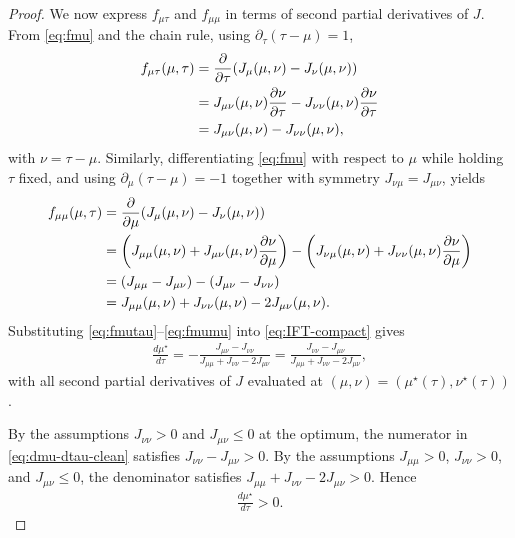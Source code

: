 \documentclass[twoside]{article}
\begin{document}
\begin{proof}
We now express $f_{\mu\tau}$ and $f_{\mu\mu}$ in terms of second partial derivatives of $J$. From \eqref{eq:fmu} and the chain rule, using $\partial_\tau(\tau - \mu) = 1$,
\begin{align}
    f_{\mu\tau}(\mu, \tau)
    &= \frac{\partial}{\partial\tau} \qty( J_\mu(\mu, \nu) - J_\nu(\mu, \nu) ) \nonumber\\
    &= J_{\mu\nu}(\mu, \nu) \frac{\partial\nu}{\partial\tau}
       - J_{\nu\nu}(\mu, \nu) \frac{\partial\nu}{\partial\tau} \nonumber\\
    &= J_{\mu\nu}(\mu, \nu) - J_{\nu\nu}(\mu, \nu),
    \label{eq:fmutau}
\end{align}
with $\nu = \tau - \mu$. Similarly, differentiating \eqref{eq:fmu} with respect to $\mu$ while holding $\tau$ fixed, and using $\partial_\mu(\tau - \mu) = -1$ together with symmetry $J_{\nu\mu} = J_{\mu\nu}$, yields
\begin{align}
    f_{\mu\mu}(\mu, \tau)
    &= \frac{\partial}{\partial\mu} \qty( J_\mu(\mu, \nu) - J_\nu(\mu, \nu) ) \nonumber\\
    &= \qty( J_{\mu\mu}(\mu, \nu) + J_{\mu\nu}(\mu, \nu) \frac{\partial\nu}{\partial\mu} )
       - \qty( J_{\nu\mu}(\mu, \nu) + J_{\nu\nu}(\mu, \nu) \frac{\partial\nu}{\partial\mu} ) \nonumber\\
    &= (J_{\mu\mu} - J_{\mu\nu}) - (J_{\mu\nu} - J_{\nu\nu}) \nonumber\\
    &= J_{\mu\mu}(\mu, \nu) + J_{\nu\nu}(\mu, \nu) - 2J_{\mu\nu}(\mu, \nu).
    \label{eq:fmumu}
\end{align}
Substituting \eqref{eq:fmutau}--\eqref{eq:fmumu} into \eqref{eq:IFT-compact} gives
\begin{align}
    \frac{d\mu^\star}{d\tau}
    = -\frac{J_{\mu\nu} - J_{\nu\nu}}{J_{\mu\mu} + J_{\nu\nu} - 2J_{\mu\nu}}
    = \frac{J_{\nu\nu} - J_{\mu\nu}}{J_{\mu\mu} + J_{\nu\nu} - 2J_{\mu\nu}},
    \label{eq:dmu-dtau-clean}
\end{align}
with all second partial derivatives of $J$ evaluated at $(\mu, \nu) = (\mu^\star(\tau), \nu^\star(\tau))$.

By the assumptions $J_{\nu\nu} > 0$ and $J_{\mu\nu} \le 0$ at the optimum, the numerator in \eqref{eq:dmu-dtau-clean} satisfies $J_{\nu\nu} - J_{\mu\nu} > 0$. By the assumptions $J_{\mu\mu} > 0$, $J_{\nu\nu} > 0$, and $J_{\mu\nu} \le 0$, the denominator satisfies $J_{\mu\mu} + J_{\nu\nu} - 2J_{\mu\nu} > 0$. Hence
\begin{align}
    \frac{d\mu^\star}{d\tau} > 0.
\end{align}


\end{proof}
\end{document}
